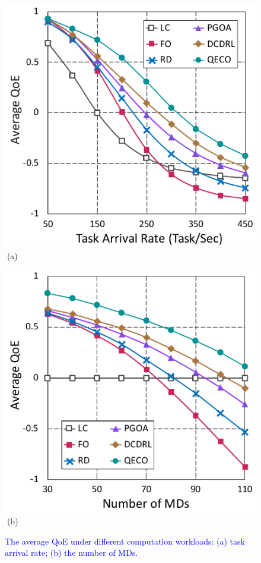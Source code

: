 \documentclass[10pt, journal,letterpaper]{IEEEtran}
\begin{document}
\begin{figure}[tbp]
\captionsetup{name=Fig.}
\begin{minipage}[b]{0.50\linewidth}
	\centering
	\includegraphics[width=\textwidth]{ qoe_1} 		
	\textcolor{white}{i}\hspace{0.6cm}(a)
\end{minipage}
\hspace{-0.2cm}
\begin{minipage}[b]{0.50\linewidth}
	\centering
	\includegraphics[width=\textwidth]{ qoe_2}
	\textcolor{white}{i}\hspace{0.6cm}(b)
\end{minipage}
\vspace{-0.7cm}
\caption{\textcolor{blue}{The average QoE under different computation workloads: (a) task arrival rate; (b) the number of MDs.}}
\label{chart4}
\end{figure} 
\end{document}
